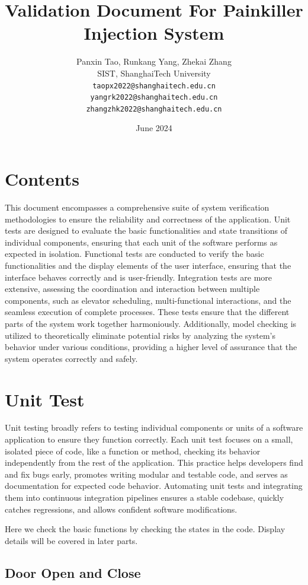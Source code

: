 \documentclass{article}
\title{\heiti Validation Document For Painkiller Injection System}
\author{%
  Panxin Tao, Runkang Yang, Zhekai Zhang\\
  SIST, ShanghaiTech University\\
  \texttt{taopx2022@shanghaitech.edu.cn}\\
  \texttt{yangrk2022@shanghaitech.edu.cn}\\
  \texttt{zhangzhk2022@shanghaitech.edu.cn}\\
}
\date{June 2024}
\begin{document}
\maketitle
\newpage
\section{Contents}
This document encompasses a comprehensive suite of system verification methodologies to ensure the reliability and correctness of the application. Unit tests are designed to evaluate the basic functionalities and state transitions of individual components, ensuring that each unit of the software performs as expected in isolation. Functional tests are conducted to verify the basic functionalities and the display elements of the user interface, ensuring that the interface behaves correctly and is user-friendly. Integration tests are more extensive, assessing the coordination and interaction between multiple components, such as elevator scheduling, multi-functional interactions, and the seamless execution of complete processes. These tests ensure that the different parts of the system work together harmoniously. Additionally, model checking is utilized to theoretically eliminate potential risks by analyzing the system's behavior under various conditions, providing a higher level of assurance that the system operates correctly and safely.
\newpage
\section{Unit Test}

Unit testing broadly refers to testing individual components or units of a software application to ensure they function correctly. Each unit test focuses on a small, isolated piece of code, like a function or method, checking its behavior independently from the rest of the application. This practice helps developers find and fix bugs early, promotes writing modular and testable code, and serves as documentation for expected code behavior. Automating unit tests and integrating them into continuous integration pipelines ensures a stable codebase, quickly catches regressions, and allows confident software modifications.

Here we check the basic functions by checking the states in the code. Display details will be covered in later parts.
\subsection*{Door Open and Close}
\end{document}
